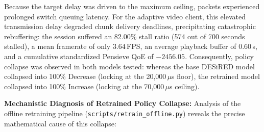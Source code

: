 \documentclass[12pt,a4paper,oneside]{report}
\begin{document}
Because the target delay was driven to the maximum ceiling, packets experienced prolonged switch queuing latency. For the adaptive video client, this elevated transmission delay degraded chunk delivery deadlines, precipitating catastrophic rebuffering: the session suffered an 82.00\% stall ratio (574 out of 700 seconds stalled), a mean framerate of only $3.64$\,FPS, an average playback buffer of $0.60$\,s, and a cumulative standardized Pensieve QoE of $-2456.05$. Consequently, policy collapse was observed in both models tested: whereas the base DESiRED model collapsed into 100\% Decrease (locking at the 20,000\,$\mu$s floor), the retrained model collapsed into 100\% Increase (locking at the 70,000\,$\mu$s ceiling).

\textbf{Mechanistic Diagnosis of Retrained Policy Collapse:}
Analysis of the offline retraining pipeline (\texttt{scripts/retrain\_offline.py}) reveals the precise mathematical cause of this collapse:
\end{document}
